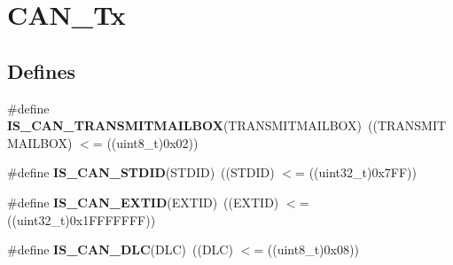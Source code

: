 \hypertarget{group__CAN__Tx}{
\section{CAN\_\-Tx}
\label{group__CAN__Tx}
}
\subsection*{Defines}
\begin{DoxyCompactItemize}
\item 
\hypertarget{group__CAN__Tx_ga218b3e1380c4d49163c91a1af904e44c}{
\#define {\bfseries IS\_\-CAN\_\-TRANSMITMAILBOX}(TRANSMITMAILBOX)~((TRANSMITMAILBOX) $<$= ((uint8\_\-t)0x02))}
\label{group__CAN__Tx_ga218b3e1380c4d49163c91a1af904e44c}

\item 
\hypertarget{group__CAN__Tx_gaf059e4383fa69dec6e18216b22a87f51}{
\#define {\bfseries IS\_\-CAN\_\-STDID}(STDID)~((STDID) $<$= ((uint32\_\-t)0x7FF))}
\label{group__CAN__Tx_gaf059e4383fa69dec6e18216b22a87f51}

\item 
\hypertarget{group__CAN__Tx_ga62dbc2163ad6751b3f921e717b00e9f2}{
\#define {\bfseries IS\_\-CAN\_\-EXTID}(EXTID)~((EXTID) $<$= ((uint32\_\-t)0x1FFFFFFF))}
\label{group__CAN__Tx_ga62dbc2163ad6751b3f921e717b00e9f2}

\item 
\hypertarget{group__CAN__Tx_ga6109469a6a2792b3e7c6be520ea50d36}{
\#define {\bfseries IS\_\-CAN\_\-DLC}(DLC)~((DLC) $<$= ((uint8\_\-t)0x08))}
\label{group__CAN__Tx_ga6109469a6a2792b3e7c6be520ea50d36}

\end{DoxyCompactItemize}
